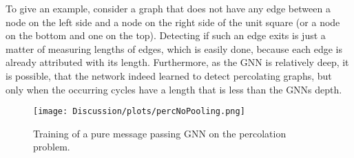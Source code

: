 To give an example, consider a graph that does not have any edge between a node on the left side and a node on the right side of the unit square
(or a node on the bottom and one on the top). Detecting if such an edge exits is just a matter of measuring lengths of edges, which is easily done,
because each edge is already attributed with its length. 
Furthermore, as the GNN is relatively deep, it is possible, that the network indeed learned to detect percolating graphs, but only when the occurring cycles
have a length that is less than the GNNs depth.
\begin{figure}[h]
    \centering
    \texttt{[image: Discussion/plots/percNoPooling.png]}
    \caption{Training of a pure message passing GNN on the percolation problem.}
    \label{fig:trainingPerc}
\end{figure}

